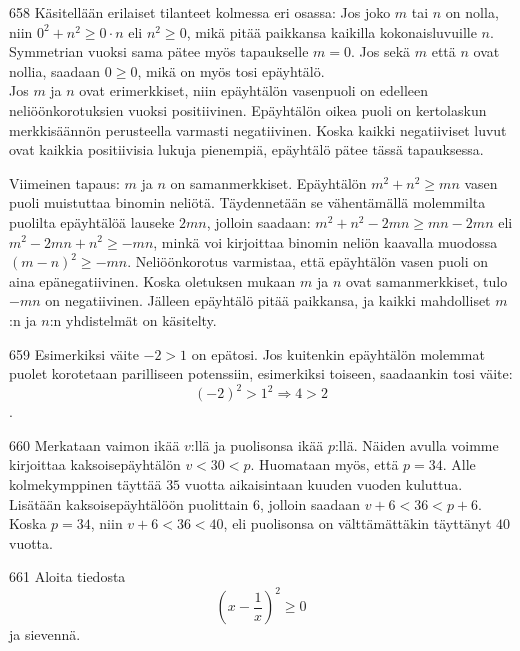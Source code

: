 \begin{Vastaus}{658}
		Käsitellään erilaiset tilanteet kolmessa eri osassa:
		Jos joko $m$ tai $n$ on nolla, niin $0^2+n^2 \geq 0\cdot n$ eli $n^2\geq 0$, mikä pitää paikkansa kaikilla kokonaisluvuille $n$. Symmetrian vuoksi sama pätee myös tapaukselle $m=0$. Jos sekä $m$ että $n$ ovat nollia, saadaan $0\geq 0$, mikä on myös tosi epäyhtälö. \\
		Jos $m$ ja $n$ ovat erimerkkiset, niin epäyhtälön vasenpuoli on edelleen neliöönkorotuksien vuoksi positiivinen. Epäyhtälön oikea puoli on kertolaskun merkkisäännön perusteella varmasti negatiivinen. Koska kaikki negatiiviset luvut ovat kaikkia positiivisia lukuja pienempiä, epäyhtälö pätee tässä tapauksessa.

		Viimeinen tapaus: $m$ ja $n$ on samanmerkkiset. Epäyhtälön $m^2+n^2 \geq mn$ vasen puoli muistuttaa binomin neliötä. Täydennetään se vähentämällä molemmilta puolilta epäyhtälöä lauseke $2mn$, jolloin saadaan: $m^2+n^2-2mn \geq mn-2mn$ eli $m^2-2mn+n^2 \geq -mn$, minkä voi kirjoittaa binomin neliön kaavalla muodossa $(m-n)^2 \geq -mn$. Neliöönkorotus varmistaa, että epäyhtälön vasen puoli on aina epänegatiivinen. Koska oletuksen mukaan $m$ ja $n$ ovat samanmerkkiset, tulo $-mn$ on negatiivinen. Jälleen epäyhtälö pitää paikkansa, ja kaikki mahdolliset $m$:n ja $n$:n yhdistelmät on käsitelty.
		
\end{Vastaus}
\begin{Vastaus}{659}
	Esimerkiksi väite $-2>1$ on epätosi. Jos kuitenkin epäyhtälön molemmat puolet korotetaan parilliseen potenssiin, esimerkiksi toiseen, saadaankin tosi väite: \[(-2)^2>1^2 \Rightarrow 4>2\].
	
\end{Vastaus}
\begin{Vastaus}{660}
		Merkataan vaimon ikää $v$:llä ja puolisonsa ikää $p$:llä. Näiden avulla voimme kirjoittaa kaksoisepäyhtälön $v<30<p$. Huomataan myös, että $p=34$. Alle kolmekymppinen täyttää $35$ vuotta aikaisintaan kuuden vuoden kuluttua. Lisätään kaksoisepäyhtälöön puolittain $6$, jolloin saadaan $v+6<36<p+6$. Koska $p=34$, niin $v+6<36<40$, eli puolisonsa on välttämättäkin täyttänyt $40$ vuotta.
		
\end{Vastaus}
\begin{Vastaus}{661}
     Aloita tiedosta \[\left(x-\frac{1}{x}\right)^2 \geq 0\] ja sievennä.
    
\end{Vastaus}
